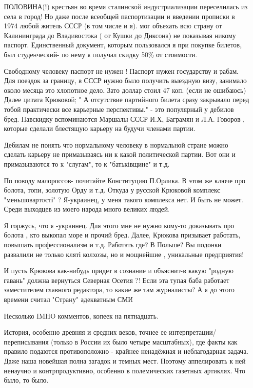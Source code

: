\begin{itemize}
ПОЛОВИНА(!) крестьян во время сталинской индустриализации переселилась из села
в город! Но даже после всеобщей паспортизации и введении прописки в 1974 любой
житель СССР (в том числе и я). мог объехать всю страну от Калининграда до
Владивостока ( от Кушки до Диксона) не показывая никому паспорт. Единственный
документ, которым пользовался я при покупке билетов, был студенческий- по нему
я получал скидку 50\% от стоимости. 

Свободному человеку паспорт не нужен ! Паспорт нужен государству и рабам. Для
поездок за границу, в СССР нужно было получить выездную визу, занимало около
месяца это хлопотное дело. Зато доллар стоил 47 коп. (если не ошибаюсь) Далее
цитата Крюковой; " А отсутствие партийного билета сразу закрывало перед тобой
практически все карьерные перспективы." - это популярный у дебилов бред.
Навскидку вспоминаются Маршалы СССР И.Х, Баграмян и Л.А. Говоров , которые
сделали блестящую карьеру на будучи членами партии. 

Дебилам не понять что нормальному человеку в нормальной стране можно сделать
карьеру не примазываясь ни к какой политической партии. Вот они и примазываются
то к "слугам", то к "батьківщине" и т.д. 

По поводу малороссов- почитайте Конституцию П.Орлика. В этом же ключе про
болота, топи, золотую Орду и т.д. Откуда у русской Крюковой комплекс
"меньшовартості" ? Я-украинец, у меня такого комплекса нет. И быть не может.
Среди выходцев из моего народа много великих людей. 

Я горжусь, что я -украинец. Для этого мне не нужно кому-то доказывать про
болота , кто выкопал море и прочий бред. Далее, Крюкова призывает работать,
повышать профессионализм и т.д. Работать где? В Польше? Вы подонки развалили не
только кляті колхозы, но и мощнейшие , уникальные предприятия!

И пусть Крюкова как-нибудь придет в сознание и объяснит-в какую "родную гавань"
должна вернуться Северная Осетия ?! Если эта тупая баба работает заместителем
главного редактора, то какие же там журналисты? А я до этого времени считал
"Страну" адекватным СМИ

 

Несколько IMHO комментов, копеек на пятнадцать.

История, особенно древняя и средних веков, точнее ее
интерпретации/переписывания (только в России их было четыре масштабных), где
факты как правило подаются противоположно - крайнее ненадёжная и неблагодарная
задача. Даже наша новейшая полна загадок и темных мест. Поэтому аппелировать к
ней ненаучно и контрпродуктивно, особенно в полемических газетных артиклях. Что
было, то было.


\end{itemize}

